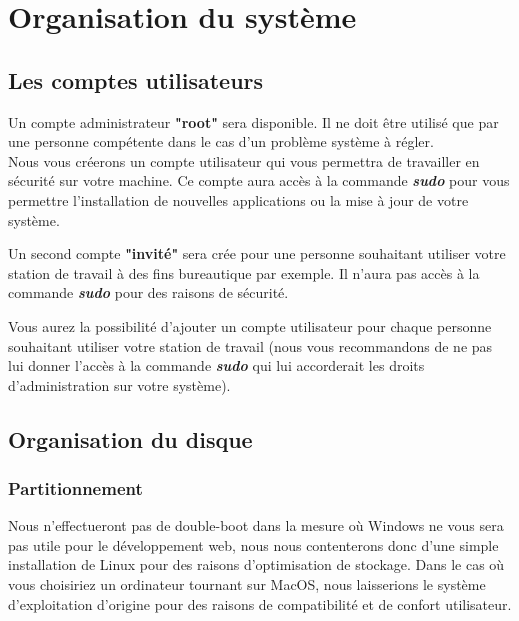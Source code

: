 \section{Organisation du système}

\subsection{Les comptes utilisateurs}

Un compte administrateur \textbf{"root"} sera disponible. Il ne doit être utilisé que par une personne compétente dans le cas d'un problème système à régler.\\

Nous vous créerons un compte utilisateur qui vous permettra de travailler en sécurité sur votre machine. Ce compte aura accès à la commande \textit{\textbf{sudo}} pour vous permettre l'installation de nouvelles applications ou la mise à jour de votre système.

Un second compte \textbf{"invité"} sera crée pour une personne souhaitant utiliser votre station de travail à des fins bureautique par exemple. Il n'aura pas accès à la commande \textit{\textbf{sudo}} pour des raisons de sécurité.

Vous aurez la possibilité d'ajouter un compte utilisateur pour chaque personne souhaitant utiliser votre station de travail (nous vous recommandons de ne pas lui donner l'accès à la commande \textit{\textbf{sudo}} qui lui accorderait les droits d'administration sur votre système).

\subsection{Organisation du disque}

\subsubsection{Partitionnement}

Nous n'effectueront pas de double-boot dans la mesure où Windows ne vous sera pas utile pour le développement web, nous nous contenterons donc d'une simple installation de Linux pour des raisons d'optimisation de stockage. Dans le cas où vous choisiriez un ordinateur tournant sur MacOS, nous laisserions le système d'exploitation d'origine pour des raisons de compatibilité et de confort utilisateur.\\

